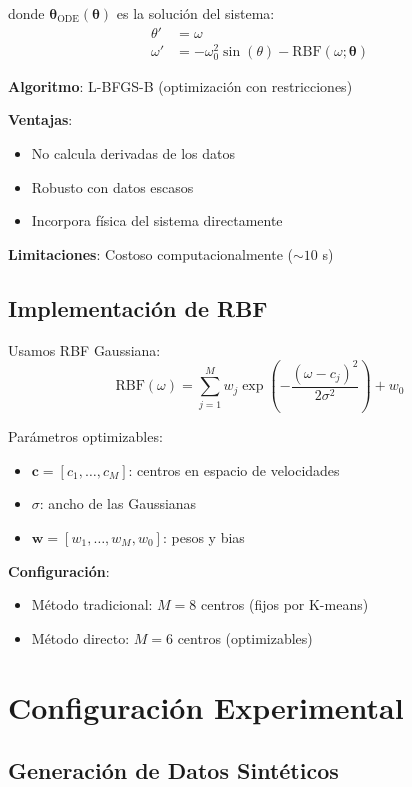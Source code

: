 \documentclass[11pt,a4paper]{article}
\begin{document}
donde $\boldsymbol{\theta}_{\text{ODE}}(\boldsymbol{\theta})$ es la solución del sistema:
\begin{align}
\theta' &= \omega \\
\omega' &= -\omega_0^2 \sin(\theta) - \text{RBF}(\omega; \boldsymbol{\theta})
\end{align}

\textbf{Algoritmo}: L-BFGS-B (optimización con restricciones)

\textbf{Ventajas}:
\begin{itemize}
\item No calcula derivadas de los datos
\item Robusto con datos escasos
\item Incorpora física del sistema directamente
\end{itemize}

\textbf{Limitaciones}: Costoso computacionalmente ($\sim 10$ s)

\subsection{Implementación de RBF}

Usamos RBF Gaussiana:
\begin{equation}
\text{RBF}(\omega) = \sum_{j=1}^{M} w_j \exp\left(-\frac{(\omega - c_j)^2}{2\sigma^2}\right) + w_0
\end{equation}

Parámetros optimizables:
\begin{itemize}
\item $\mathbf{c} = [c_1, \ldots, c_M]$: centros en espacio de velocidades
\item $\sigma$: ancho de las Gaussianas
\item $\mathbf{w} = [w_1, \ldots, w_M, w_0]$: pesos y bias
\end{itemize}

\textbf{Configuración}:
\begin{itemize}
\item Método tradicional: $M = 8$ centros (fijos por K-means)
\item Método directo: $M = 6$ centros (optimizables)
\end{itemize}

\section{Configuración Experimental}

\subsection{Generación de Datos Sintéticos}
\end{document}
